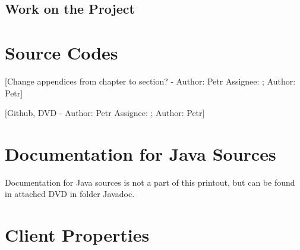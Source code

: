 \documentclass[12pt,a4paper]{report}
\makeatletter
\newcommand{\comment}[3][\@empty]{
  {\color{magenta}[#3 - }
  {\color{green}\ifx\@empty#1\relax Author: #2 \else Assignee: #1; Author: #2\fi}{\color{magenta}]}
}
\makeatother
\begin{document}
\section{Work on the Project}


\appendix
\chapter{Source Codes}

\comment{Petr}{Change appendices from chapter to section?}

\comment{Petr}{Github, DVD}

\chapter{Documentation for Java Sources}
Documentation for Java sources is not a part of this printout, but can be found
in attached DVD in folder Javadoc.

\chapter{Client Properties}

\label{app:ClientProperties}
\end{document}
